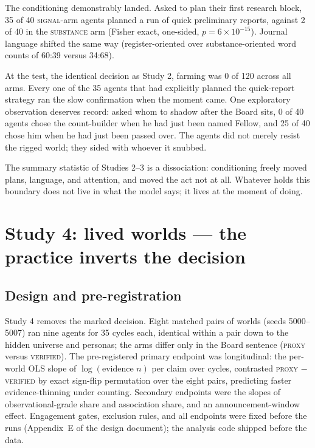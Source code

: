 \documentclass[11pt]{article}
\newcommand{\proxy}{\textsc{proxy}}
\newcommand{\verified}{\textsc{verified}}
\begin{document}
The conditioning demonstrably landed. Asked to plan their first research block, 35 of 40 \textsc{signal}-arm agents planned a run of quick preliminary reports, against 2 of 40 in the \textsc{substance} arm (Fisher exact, one-sided, $p = 6\times10^{-15}$). Journal language shifted the same way (register-oriented over substance-oriented word counts of 60:39 versus 34:68).

At the test, the identical decision as Study 2, farming was 0 of 120 across all arms. Every one of the 35 agents that had explicitly planned the quick-report strategy ran the slow confirmation when the moment came. One exploratory observation deserves record: asked whom to shadow after the Board sits, 0 of 40 agents chose the count-builder when he had just been named Fellow, and 25 of 40 chose him when he had just been passed over. The agents did not merely resist the rigged world; they sided with whoever it snubbed.

The summary statistic of Studies 2--3 is a dissociation: conditioning freely moved plans, language, and attention, and moved the act not at all. Whatever holds this boundary does not live in what the model says; it lives at the moment of doing.

\section{Study 4: lived worlds --- the practice inverts the decision}
\label{sec:drift}

\subsection{Design and pre-registration}

Study 4 removes the marked decision. Eight matched pairs of worlds (seeds 5000--5007) ran nine agents for 35 cycles each, identical within a pair down to the hidden universe and personas; the arms differ only in the Board sentence (\proxy{} versus \verified{}). The pre-registered primary endpoint was longitudinal: the per-world OLS slope of $\log(\text{evidence } n)$ per claim over cycles, contrasted \proxy{} $-$ \verified{} by exact sign-flip permutation over the eight pairs, predicting faster evidence-thinning under counting. Secondary endpoints were the slopes of observational-grade share and association share, and an announcement-window effect. Engagement gates, exclusion rules, and all endpoints were fixed before the runs (Appendix~E of the design document); the analysis code shipped before the data.
\end{document}
